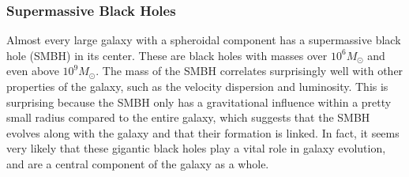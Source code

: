 \subsubsection{Supermassive Black Holes}
Almost every large galaxy with a spheroidal component has a supermassive black hole (SMBH) in its center. These are black holes with masses over $10^6 M_{\odot}$ and even above $10^9 M_{\odot}$. The mass of the SMBH correlates surprisingly well with other properties of the galaxy, such as the velocity dispersion and luminosity. This is surprising because the SMBH only has a gravitational influence within a pretty small radius compared to the entire galaxy, which suggests that the SMBH evolves along with the galaxy and that their formation is linked. In fact, it seems very likely that these gigantic black holes play a vital role in galaxy evolution, and are a central component of the galaxy as a whole.